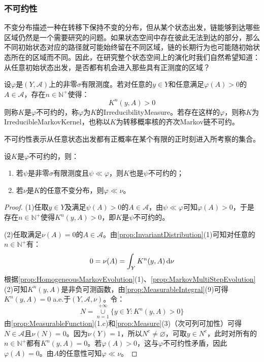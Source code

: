 \subsubsection{不可约性}
不变分布描述一种在转移下保持不变的分布，但从某个状态出发，链能够到达哪些区域仍然是一个需要研究的问题。如果状态空间中存在彼此无法到达的部分，那么不同初始状态对应的路径就可能始终留在不同区域，链的长期行为也可能随初始状态所在的区域而不同。因此，在研究整个状态空间上的演化时我们自然希望知道：从任意初始状态出发，是否都有机会进入那些具有正测度的区域？
\begin{definition}
	设$\varphi$是$(Y,\mathscr{A})$上的非零$\sigma$有限测度。若对任意的$y\in Y$和任意满足$\varphi(A)>0$的$A\in\mathscr{A}$，存在$n\in\mathbb{N}^+$使得：
	\begin{equation*}
		K^n(y,A)>0
	\end{equation*}
	则称$K$是$\varphi$不可约的，称$\varphi$为$K$的\gls{IrreducibilityMeasure}。若存在这样的$\varphi$，则称$K$为\gls{IrreducibleMarkovKernel}，也称以$K$为转移概率核的齐次Markov链不可约。
\end{definition}
\begin{note}
	不可约性表示从任意状态出发都有正概率在某个有限的正时刻进入所考察的集合。
\end{note}
\begin{property}\label{prop:IrreducibilityMeasure}
	设$K$是$\varphi$不可约的，则：
	\begin{enumerate}
		\item 若$\psi$是非零$\sigma$有限测度且$\psi\ll\varphi$，则$K$也是$\psi$不可约的；
		\item 若$\nu$是$K$的任意不变分布，则$\varphi\ll\nu$。
	\end{enumerate}
\end{property}
\begin{proof}
	(1)任取$y\in Y$及满足$\psi(A)>0$的$A\in\mathscr{A}$，由$\psi\ll\varphi$可知$\varphi(A)>0$，于是存在$n\in\mathbb{N}^+$使得$K^n(y,A)>0$，即$K$是$\psi$不可约的。\par
	(2)任取满足$\nu(A)=0$的$A\in\mathscr{A}$。由\cref{prop:InvariantDistribution}(1)可知对任意的$n\in\mathbb{N}^+$有：
	\begin{equation*}
		0=\nu(A)=\int_{Y}K^n(y,A)\mathop{}\!\mathrm{d}\nu
	\end{equation*}
	根据\cref{prop:HomogeneousMarkovEvolution}(1)、\cref{prop:MarkovMultiStepEvolution}(2)可知$K^n(y,A)$是非负可测函数，由\cref{prop:MeasurableIntegral}(9)可得$K^n(y,A)=0\;$a.e.于$(Y,\mathscr{A},\nu)$。令：
	\begin{equation*}
		N=\underset{n=1}{\overset{+\infty}{\cup}}\{y\in Y:K^n(y,A)>0\}
	\end{equation*}
	由\cref{prop:MeasurableFunction}(1.c)和\cref{prop:Measure}(3)（次可列可加性）可得$N\in\mathscr{A}$且$\nu(N)=0$。因为$\nu(Y)=1$，所以$N^c\ne\varnothing$，可取$y\in N^c$，此时对所有的$n\in\mathbb{N}^+$都有$K^n(y,A)=0$。若$\varphi(A)>0$，这与$\varphi$不可约性矛盾，因此$\varphi(A)=0$。由$A$的任意性可知$\varphi\ll\nu$。
\end{proof}
